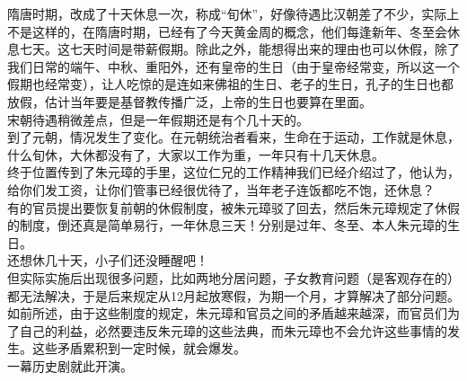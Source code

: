 \begin{multicols}{\theparacolNo}
隋唐时期，改成了十天休息一次，称成“旬休”，好像待遇比汉朝差了不少，实际上不是这样的，在隋唐时期，已经有了今天黄金周的概念，他们每逢新年、冬至会休息七天。这七天时间是带薪假期。除此之外，能想得出来的理由也可以休假，除了我们日常的端午、中秋、重阳外，还有皇帝的生日（由于皇帝经常变，所以这一个假期也经常变），让人吃惊的是连如来佛祖的生日、老子的生日，孔子的生日也都放假，估计当年要是基督教传播广泛，上帝的生日也要算在里面。\\

宋朝待遇稍微差点，但是一年假期还是有个几十天的。\\

到了元朝，情况发生了变化。在元朝统治者看来，生命在于运动，工作就是休息，什么旬休，大休都没有了，大家以工作为重，一年只有十几天休息。\\

终于位置传到了朱元璋的手里，这位仁兄的工作精神我们已经介绍过了，他认为，给你们发工资，让你们管事已经很优待了，当年老子连饭都吃不饱，还休息？\\

有的官员提出要恢复前朝的休假制度，被朱元璋驳了回去，然后朱元璋规定了休假的制度，倒还真是简单易行，一年休息三天！分别是过年、冬至、本人朱元璋的生日。\\

还想休几十天，小子们还没睡醒吧！\\

但实际实施后出现很多问题，比如两地分居问题，子女教育问题（是客观存在的）都无法解决，于是后来规定从12月起放寒假，为期一个月，才算解决了部分问题。\\

如前所述，由于这些制度的规定，朱元璋和官员之间的矛盾越来越深，而官员们为了自己的利益，必然要违反朱元璋的这些法典，而朱元璋也不会允许这些事情的发生。这些矛盾累积到一定时候，就会爆发。\\

一幕历史剧就此开演。\\
\ifnum{}
	\end{multicols}
\fi
\newpage
